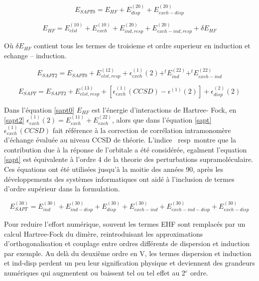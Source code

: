 \begin{equation}
E_{SAPT0} = E_{HF} + E_{disp}^{(20)} + E_{exch-disp}^{(20)} \label{sapt0}
\end{equation}

\begin{equation}
E_{HF} = E_{elst}^{(10)} + E_{exch}^{(10)} + E_{ind,resp}^{(20)} + E_{exch-ind,resp}^{(20)} + \delta E_{HF}
\end{equation}

Où $\delta E_{HF}$ contient tous les termes de troisieme et ordre superieur en induction et echange – induction. 

\begin{equation}
E_{SAPT2} = E_{SAPT0} + E_{elst,resp}^{(12)} + \epsilon_{exch}^{(1)} (2) + ^{t}E_{ind}^{(22)} + ^{t}E_{exch-ind}^{(22)} \label{sapt2}
\end{equation}

\begin{equation}
E_{SAPT} = E_{SAPT2} + E_{elst,resp}^{(13)} + [\epsilon_{exch}^{(1)} (CCSD) - \epsilon^{(1)}(2)] + \epsilon_{disp}^{(2)}(2) \label{sapt}
\end{equation}

Dans l’équation \ref{sapt0} $E_{HF}$ est l’énergie d’interactions de Hartree- Fock, en \ref{sapt2} $\epsilon_{exch}^{(1)}(2) = E_{exch}^{(11)} + E_{exch}^{(22)}$, alors que dans l’équation \ref{sapt}  $\epsilon_{exch}^{(1)}(CCSD)$ fait référence à la correction de corrélation intramonomère d’échange évaluée au niveau CCSD de théorie. L’indice \og resp \fg montre que la contribution due à la réponse de l’orbitale a été considérée, egalment l'equation \ref{sapt} est équivalente à l'ordre 4 de la theorie des perturbations supramoléculaire. Ces équations ont été utilisées jusqu'à la moitie des années 90, après les développements des systèmes informatiques ont aidé à l’inclusion de termes d’ordre supérieur dans la formulation.

\begin{equation}
E_{SAPT}^{(30)} = E_{ind}^{(30)} + E_{ind-disp}^{(30)} + E_{disp}^{(30)} + E_{exch-ind}^{(30)} + E_{exch-ind-disp}^{(30)} + E_{exch-disp}^{(30)}
\end{equation}

Pour reduire l’effort numérique, souvent les termes EHF sont remplacés par un calcul Hartree-Fock du dimère, reintroduisant les approximations d’orthogonalisation et couplage entre ordres différents de dispersion et induction par exemple.
Au delà du deuxième ordre en V, les termes dispersion et induction et ind-disp perdent un peu leur signification physique et deviennent des grandeurs numériques qui augmentent ou baissent tel ou tel effet au 2$^{e}$ ordre.

